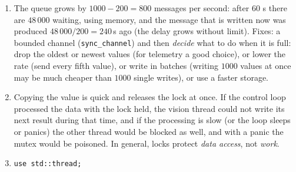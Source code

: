 \begin{enumerate}[label=\textbf{\ansnum.\arabic*}]
\begin{verbatim}
fn main() {
    let (tx, rx) = mpsc::channel();
    let p = thread::spawn(move || {
        for i in 1..=10 { tx.send(i as f64).unwrap(); }
    });
    let (mut n, mut sum) = (0, 0.0);
    for v in rx {
        n += 1;
        sum += v;
        println!("{n}: average {:.2}", sum / n as f64);
    }
    p.join().unwrap();
}
\end{verbatim}
The last line is \verb!10: average 5.50!. The loop ends when the sender \verb!tx! is dropped, which happens when the producer thread ends.
  \item The queue grows by $1000-200=800$ messages per second: after $60$ s there are $48\,000$ waiting, using memory, and the message that is written now was produced $48\,000/200=240$\,s ago (the delay grows without limit). Fixes: a bounded channel (\verb!sync_channel!) and then \emph{decide} what to do when it is full: drop the oldest or newest values (for telemetry a good choice), or lower the rate (send every fifth value), or write in batches (writing $1000$ values at once may be much cheaper than $1000$ single writes), or use a faster storage.
  \item Copying the value is quick and releases the lock at once. If the control loop processed the data with the lock held, the vision thread could not write its next result during that time, and if the processing is slow (or the loop sleeps or panics) the other thread would be blocked as well, and with a panic the mutex would be poisoned. In general, locks protect \emph{data access}, not \emph{work}.
  \item
\begin{verbatim}
use std::thread;


\end{verbatim}
\end{enumerate}
